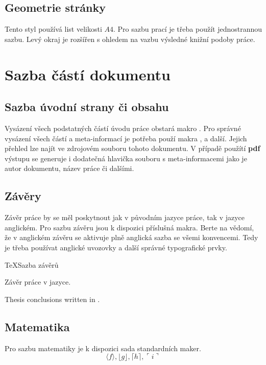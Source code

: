 \documentclass[
  biblatex,
  figures=false,
  glossaries,
  index
]{kidiplom}
\begin{document}
\subsection{Geometrie stránky}
Tento styl používá list velikosti $A4$. Pro sazbu prací je třeba použít jednostrannou sazbu. Levý okraj je rozšířen s ohledem na vazbu výsledné knižní podoby práce.

\section{Sazba částí dokumentu}
\subsection{Sazba úvodní strany či obsahu}
Vysázení všech podstatných částí úvodu práce obstará makro . Pro správné vysázení všech částí a meta-informací je potřeba použí makra , \mbox{} a další. Jejich přehled lze najít ve zdrojovém souboru tohoto dokumentu. V případě použítí \textbf{pdf} výstupu se generuje i dodatečná hlavička souboru s meta-informacemi jako je autor dokumentu, název práce či dalšími.

\subsection{Závěry}
Závěr práce by se měl poskytnout jak v původním jazyce práce, tak v jazyce anglickém. Pro sazbu závěru jsou k dispozici příslušná makra. Berte na vědomí, že v anglickém závěru se aktivuje plně anglická sazba se všemi konvencemi. Tedy je třeba používat anglické uvozovky a další správné typografické prvky.

\begin{kicode}{TeX}{}{Sazba závěrů}
\begin{kiconclusions}
Závěr práce v  jazyce.
\end{kiconclusions}

\begin{kiconclusions}[english]
Thesis conclusions written in .
\end{kiconclusions}
\end{kicode}

\subsection{Matematika}
Pro sazbu matematiky je k dispozici sada standardních maker.
$$\langle f \rangle, \lfloor g \rfloor,
\lceil h \rceil, \ulcorner i \urcorner$$
\end{document}
